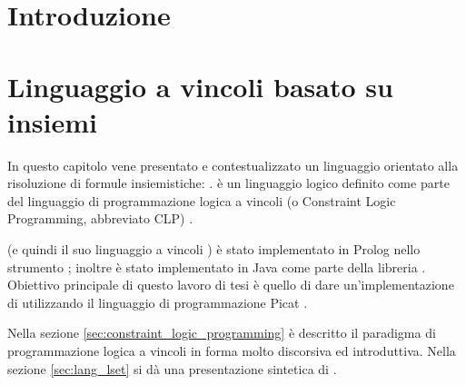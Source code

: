 \documentclass[12pt,a4paper,openright]{book} %
\newenvironment{dedication}                   %
  {%
   \thispagestyle{empty}%
   \vspace*{\stretch{1}}%
   \itshape             %
   \raggedleft          %
  }
  {\par %
   \vspace{\stretch{3}} %
   \clearpage           %
  }
\begin{document}

\tableofcontents



\chapter*{Introduzione}

\lipsum[1-4]


%
%


\chapter{Linguaggio a vincoli basato su insiemi}
\label{ch:sets_based_constraint_language}

\minitoc

In questo capitolo vene presentato e contestualizzato un linguaggio orientato alla risoluzione di formule insiemistiche: \lset{}. \lset{} è un linguaggio logico definito come parte del linguaggio di programmazione logica a vincoli (o Constraint Logic Programming, abbreviato CLP) \clpset{}.

\clpset{} (e quindi il suo linguaggio a vincoli \lset{}) è stato implementato in Prolog nello strumento \setlog{} \cite{SetLog}; inoltre \lset{} è stato implementato in Java come parte della libreria \jsetl{} \cite{JSetL}. Obiettivo principale di questo lavoro di tesi è quello di dare un’implementazione di \lset{} utilizzando il linguaggio di programmazione Picat \cite{PicatLang}.

Nella sezione \ref{sec:constraint_logic_programming} è descritto il paradigma di programmazione logica a vincoli in forma molto discorsiva ed introduttiva. Nella sezione \ref{sec:lang_lset} si dà una presentazione sintetica di \lset{}.
\end{document}
